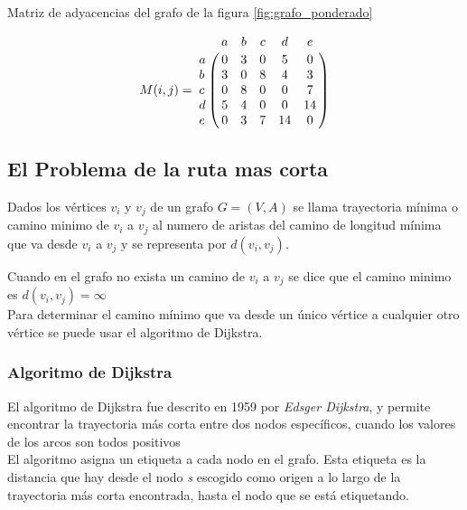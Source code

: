         \begin{table}[!ht]
          \label{tab:matriz}
          \begin{center}
            \caption{Matriz de adyacencias del grafo de la figura  \ref{fig:grafo_ponderado}}
            \begin{displaymath}
              M(i,j) =
              \bordermatrix{ ~ & a & b & c & d & e \cr
                             a & 0 & 3 & 0 & 5 & 0 \cr
                             b & 3 & 0 & 8 & 4 & 3 \cr
                             c & 0 & 8 & 0 & 0 & 7 \cr
                             d & 5 & 4 & 0 & 0 & 14\cr
                             e & 0 & 3 & 7 & 14& 0  }
            \end{displaymath}
          \end{center}
        \end{table}



    \subsection{El Problema de la ruta mas corta} %
    \label{sub:ruta_mas_corta}
      Dados los vértices $v_{i}$ y $v_{j}$ de un grafo $G = (V,A)$ se llama trayectoria mínima o camino minimo  de \(v_i\) a \(v_j\) al numero de aristas del camino de longitud mínima que va desde $v_i$ a $v_j$ y se representa por $d(v_i, v_j)$.

      Cuando en el grafo no exista un camino de $v_i$ a $v_j$ se dice que el camino minimo es $d(v_i, v_j) = \infty$ \\

      Para determinar el camino mínimo que va desde un único vértice a cualquier otro vértice se puede usar el algoritmo de Dijkstra.



      \subsubsection{Algoritmo de Dijkstra} %
      \label{subs:algoritmo_de_dijkstra}
      El algoritmo de  Dijkstra fue descrito en 1959 por \emph{Edsger Dijkstra}, y permite encontrar la trayectoria más corta entre dos nodos específicos, cuando los valores de los arcos son todos positivos\\

      El algoritmo asigna un etiqueta a cada nodo en el grafo. Esta etiqueta es la distancia que hay desde el nodo \emph{s} escogido como origen a lo largo de la trayectoria más corta encontrada, hasta el nodo que se está etiquetando.\\

